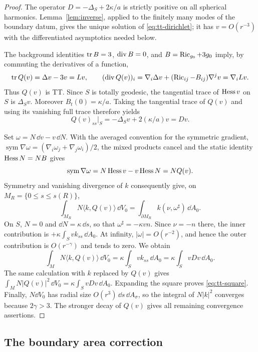 \begin{proof}
The operator $D=-\Delta_S+2\kappa/a$ is strictly positive on all spherical
harmonics.  Lemma~\ref{lem:inverse}, applied to the finitely many modes of
the boundary datum, gives the unique solution of
\eqref{eq:tt-dirichlet}; it has $v=O(r^{-3})$ with the differentiated
asymptotics needed below.

The background identities $\operatorname{tr} B=3$, $\operatorname{div} B=0$, and
$B=\operatorname{Ric}_{g_0}+3g_0$ imply, by commuting the derivatives of a function,
\[
 \operatorname{tr} Q(v)=\Delta v-3v=Lv,
 \qquad
 (\operatorname{div} Q(v))_i
 =\nabla_i\Delta v+(\operatorname{Ric}_{ij}-B_{ij})\nabla^jv
 =\nabla_iLv.
\]
Thus $Q(v)$ is TT.  Since $S$ is totally geodesic, the tangential trace of
$\operatorname{Hess} v$ on $S$ is $\Delta_Sv$.  Moreover $B_t(0)=\kappa/a$.
Taking the tangential trace of $Q(v)$ and using its vanishing full trace
therefore yields
\begin{equation}
 Q(v)_{ss}|_S=-\Delta_Sv+2(\kappa/a)v=Dv.
 \label{eq:q-normal-boundary}
\end{equation}

Set $\omega=N\,\dd v-v\,\dd N$.  With the averaged convention for
the symmetric gradient, $\operatorname{sym}\nabla\omega
=(\nabla_i\omega_j+\nabla_j\omega_i)/2$, the mixed products cancel and
the static identity $\operatorname{Hess} N=NB$ gives
\[
 \operatorname{sym}\nabla\omega
 =N\operatorname{Hess} v-v\operatorname{Hess} N=NQ(v).
\]
Symmetry and vanishing divergence of $k$ consequently give, on
$M_R=\{0\leq s\leq s(R)\}$,
\[
 \int_{M_R}N\langle k,Q(v)\rangle\,\dd V_0
 =\int_{\partial M_R}k(\nu,\omega^\sharp)\,\dd A_0.
\]
On $S$, $N=0$ and $\dd N=\kappa\,\dd s$, so that
$\omega^\sharp=-\kappa vn$.  Since $\nu=-n$ there, the inner contribution
is $+\kappa\int_Svk_{ss}\,\dd A_0$.  At infinity,
$|\omega|=O(r^{-2})$, and hence the outer contribution is
$O(r^{-\gamma})$ and tends to zero.  We obtain
\begin{equation}
 \int_M N\langle k,Q(v)\rangle\,\dd V_0
 =\kappa\int_Svk_{ss}\,\dd A_0
 =\kappa\int_SvDv\,\dd A_0.
 \label{eq:tt-pairing}
\end{equation}
The same calculation with $k$ replaced by $Q(v)$ gives
$\int_MN|Q(v)|^2\,\dd V_0=\kappa\int_SvDv\,\dd A_0$.
Expanding the square proves \eqref{eq:tt-square}.
Finally, $N\dd V_0$ has radial size $O(r^3)\,\dd s\,\dd A_\sigma$,
so the integral of $N|k|^2$ converges because $2\gamma>3$.
The stronger decay of $Q(v)$ gives all remaining convergence assertions.
\end{proof}

\subsection{The boundary area correction}

